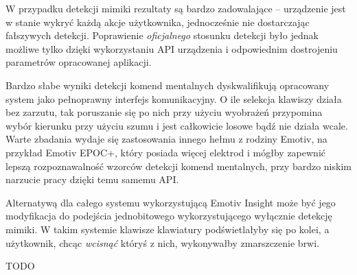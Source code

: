 \documentclass[skorowidz,skroty]{dyplomWEZUT}
\begin{document}
W przypadku detekcji mimiki rezultaty są bardzo zadowalające -- urządzenie jest w stanie wykryć każdą akcje użytkownika, jednocześnie nie dostarczając fałszywych detekcji. Poprawienie \textit{oficjalnego} stosunku detekcji było jednak możliwe tylko dzięki wykorzystaniu API urządzenia i odpowiednim dostrojeniu parametrów opracowanej aplikacji. 

Bardzo słabe wyniki detekcji komend mentalnych dyskwalifikują opracowany system jako pełnoprawny interfejs komunikacyjny. O ile selekcja klawiszy działa bez zarzutu, tak poruszanie się po nich przy użyciu wyobrażeń przypomina wybór kierunku przy użyciu szumu i jest całkowicie losowe bądź nie działa wcale. Warte zbadania wydaje się zastosowania innego hełmu z rodziny Emotiv, na przykład Emotiv EPOC+, który posiada więcej elektrod i mógłby zapewnić lepszą rozpoznawalność wzorców detekcji komend mentalnych, przy bardzo niskim narzucie pracy dzięki temu samemu API.

Alternatywą dla całego systemu wykorzystującą Emotiv Insight może być jego modyfikacja do podejścia jednobitowego wykorzystującego wyłącznie detekcję mimiki. W takim systemie klawisze klawiatury podświetlałyby się po kolei, a użytkownik, chcąc \textit{wcisnąć} któryś z nich, wykonywałby zmarszczenie brwi.


\FloatBarrier
\begin{zakonczenie}\label{chap:zakonczenie}
TODO
\end{zakonczenie}

\printbibliography[heading=bibintoc]

\listoftables

\listoffigures

\listoflistings


\printindex
\end{document}
